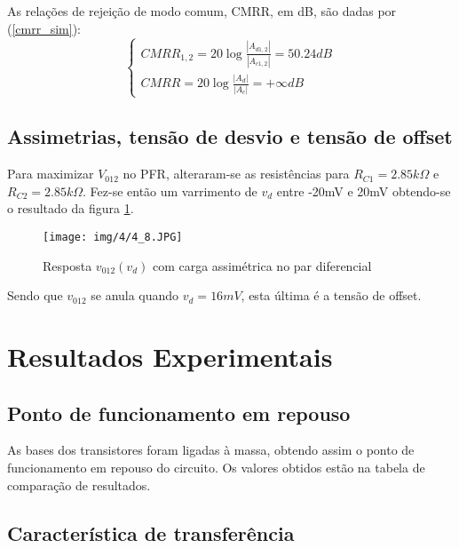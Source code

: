 \documentclass[a4paper,2pt]{report}
\begin{document}
\par As relações de rejeição de modo comum, CMRR, em dB, são dadas por (\ref{cmrr_sim}):
\begin{equation}
    \begin{cases}
        \textit{CMRR}_{1,2} = 20\log \frac{|A_{d1,2}|}{|A_{c1,2}|} = 50.24\textit{dB} \\
        \textit{CMRR} = 20\log \frac{|A_{d}|}{|A_{c}|} = +\infty\textit{dB}
    \end{cases}
    \label{cmrr_sim}
\end{equation}

\section{Assimetrias, tensão de desvio e tensão de offset}

\par Para maximizar \(V_{012}\) no PFR, alteraram-se as resistências para \(R_{C1} = 2.85k\Omega\) e \(R_{C2} = 2.85k\Omega\). Fez-se então um varrimento de \(v_d\) entre -20mV e 20mV obtendo-se o resultado da figura \ref{4_8}.

\begin{figure}[H]
    \centering
    \texttt{[image: img/4/4\_8.JPG]}
    \caption{Resposta \(v_{012}(v_d)\) com carga assimétrica no par diferencial}
    \label{4_8}
\end{figure}

\par Sendo que \(v_{012}\) se anula quando \(v_d = 16\textit{mV}\), esta última é a tensão de offset.

\chapter{Resultados Experimentais}

\section{Ponto de funcionamento em repouso}

\par As bases dos transistores foram ligadas à massa, obtendo assim o ponto de funcionamento em repouso do circuito. Os valores obtidos estão na tabela de comparação de resultados.

\section{Característica de transferência}
\end{document}
